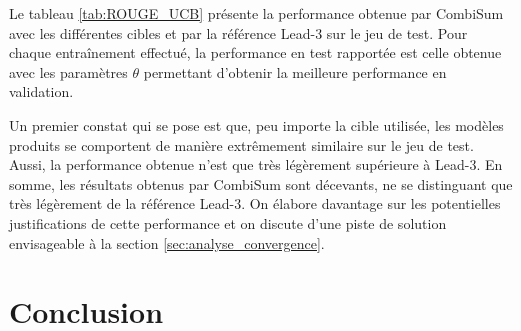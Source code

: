 Le tableau \ref{tab:ROUGE_UCB} présente la performance 
obtenue par CombiSum avec les différentes cibles et par la référence Lead-3 sur le jeu de test.
Pour chaque entraînement effectué, la performance en test 
rapportée est celle obtenue avec les paramètres $\theta$
permettant d'obtenir la meilleure performance en validation.

\begin{table}[!ht]
    \centering
    \def\arraystretch{1.8}
    \caption[Score ROUGE de CombiSum sur le jeu de test
    selon la cible utilisée]{Score ROUGE (plus élevé est meilleur) de CombiSum sur le jeu de test
    selon la cible utilisée}
    \label{tab:ROUGE_UCB}
\end{table}

Un premier constat qui se pose est que, peu importe la cible 
utilisée, les modèles produits se comportent de manière 
extrêmement similaire sur le jeu de test.
Aussi, la performance obtenue n'est que 
très légèrement supérieure à Lead-3.
En somme, les résultats obtenus par CombiSum sont décevants,
ne se distinguant que très légèrement de la référence Lead-3.
On élabore davantage sur les potentielles 
justifications de cette performance et on discute
d'une piste de solution envisageable à la section \ref{sec:analyse_convergence}.

\section{Conclusion}

